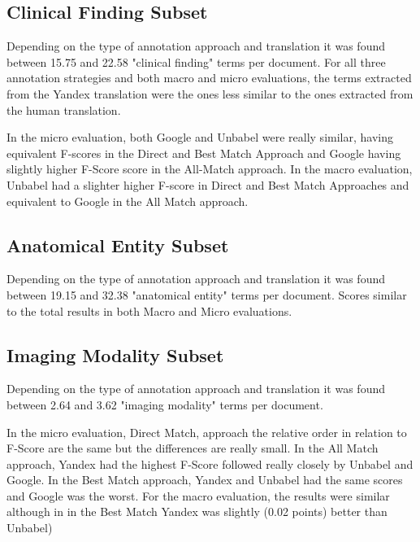 \subsection{Clinical Finding Subset}

Depending on the type of annotation approach and translation it was found between 15.75 and 22.58 "clinical finding" terms per document. For all three annotation strategies and both macro and micro evaluations, the terms extracted from the Yandex translation were the ones less similar to the ones extracted from the human translation. 

In the micro evaluation, both Google and Unbabel were really similar, having equivalent F-scores in the Direct and Best Match Approach and Google having slightly higher F-Score score in the All-Match approach. In the macro evaluation, Unbabel had a slighter higher F-score in Direct and Best Match Approaches and equivalent to Google in the All Match approach.




\subsection{Anatomical Entity Subset}

Depending on the type of annotation approach and translation it was found between 19.15 and 32.38 "anatomical entity" terms per document. Scores similar to the total results in both Macro and Micro evaluations.

\subsection{Imaging Modality Subset}

Depending on the type of annotation approach and translation it was found between 2.64 and 3.62 "imaging modality" terms per document. 

In the micro evaluation, Direct Match, approach the relative order in relation to F-Score are the same but the differences are really small. In the All Match approach, Yandex had the highest F-Score followed really closely by Unbabel and Google. In the Best Match approach, Yandex and Unbabel had the same scores and Google was the worst. For the macro evaluation, the results were similar although in in the Best Match Yandex was slightly (0.02 points) better than Unbabel)

